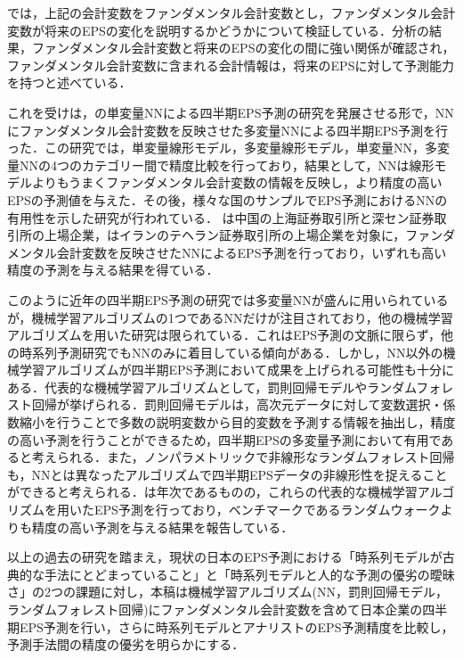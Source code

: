 \documentclass[a4paper，11pt]{jsarticle}
\begin{document}
\noindent
\cite*{abarbanell1997fundamental}では，上記の会計変数をファンダメンタル会計変数とし，ファンダメンタル会計変数が将来のEPSの変化を説明するかどうかについて検証している．分析の結果，ファンダメンタル会計変数と将来のEPSの変化の間に強い関係が確認され，ファンダメンタル会計変数に含まれる会計情報は，将来のEPSに対して予測能力を持つと述べている．

これを受け\cite{zhang2004neural}は，\cite{callen1996neural}の単変量NNによる四半期EPS予測の研究を発展させる形で，NNにファンダメンタル会計変数を反映させた多変量NNによる四半期EPS予測を行った．この研究では，単変量線形モデル，多変量線形モデル，単変量NN，多変量NNの4つのカテゴリー間で精度比較を行っており，結果として，NNは線形モデルよりもうまくファンダメンタル会計変数の情報を反映し，より精度の高いEPSの予測値を与えた．その後，様々な国のサンプルでEPS予測におけるNNの有用性を示した研究が行われている．\cite*{cao2009forecasting} は中国の上海証券取引所と深セン証券取引所の上場企業，\cite{etemadi2015earnings}はイランのテヘラン証券取引所の上場企業を対象に，ファンダメンタル会計変数を反映させたNNによるEPS予測を行っており，いずれも高い精度の予測を与える結果を得ている．

このように近年の四半期EPS予測の研究では多変量NNが盛んに用いられているが，機械学習アルゴリズムの1つであるNNだけが注目されており，他の機械学習アルゴリズムを用いた研究は限られている．これはEPS予測の文脈に限らず，他の時系列予測研究でもNNのみに着目している傾向がある\citep{ahmed2010empirical}．しかし，NN以外の機械学習アルゴリズムが四半期EPS予測において成果を上げられる可能性も十分にある．代表的な機械学習アルゴリズムとして，罰則回帰モデルやランダムフォレスト回帰が挙げられる\citep{hastie2009esl}．罰則回帰モデルは，高次元データに対して変数選択・係数縮小を行うことで多数の説明変数から目的変数を予測する情報を抽出し，精度の高い予測を行うことができるため，四半期EPSの多変量予測において有用であると考えられる．また，ノンパラメトリックで非線形なランダムフォレスト回帰\citep{breiman2001random}も，NNとは異なったアルゴリズムで四半期EPSデータの非線形性を捉えることができると考えられる．\cite*{cao2020fundamental}は年次であるものの，これらの代表的な機械学習アルゴリズムを用いたEPS予測を行っており，ベンチマークであるランダムウォークよりも精度の高い予測を与える結果を報告している．

以上の過去の研究を踏まえ，現状の日本のEPS予測における「時系列モデルが古典的な手法にとどまっていること」と「時系列モデルと人的な予測の優劣の曖昧さ」の2つの課題に対し，本稿は機械学習アルゴリズム(NN，罰則回帰モデル，ランダムフォレスト回帰)にファンダメンタル会計変数を含めて日本企業の四半期EPS予測を行い，さらに時系列モデルとアナリストのEPS予測精度を比較し，予測手法間の精度の優劣を明らかにする．
\end{document}
